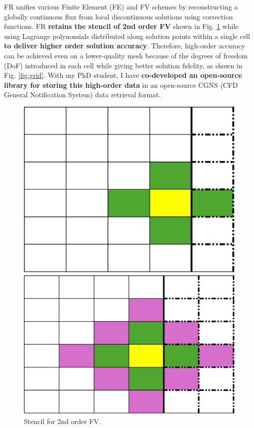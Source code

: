 \documentclass[11pt,sans]{wlscirep} %
\begin{document}
FR unifies various Finite Element (FE) and FV schemes by reconstructing a globally continuous flux from local discontinuous solutions using correction functions. FR \textbf{retains the stencil of 2nd order FV} shown in Fig. \ref{fig:stencil_2O} while using Lagrange polynomials distributed along solution points within a single cell \textbf{to deliver higher order solution accuracy}. Therefore, high-order accuracy can be achieved even on a lower-quality mesh because of the degrees of freedom (DoF) introduced in each cell while giving better solution fidelity, as shown in Fig. \ref{fig:grid}. With my PhD student, I have \textbf{co-developed an open-source library for storing this high-order data} in an open-source CGNS (CFD General Notification System) data retrieval format\cite{dhib2024input}.
\begin{figure}[H]
     \begin{minipage}{.45\textwidth}
        \centering
        \includegraphics[trim={0cm 0cm 0cm 0cm},clip,scale=0.5]{figures/2nd_order_fv_BC.png}
        \caption{Stencil for 2nd order FV.}%
        \label{fig:stencil_2O}
    \end{minipage}
    \hfill
    \begin{minipage}{0.45\textwidth}
        \centering
        \includegraphics[trim={0cm 0cm 0cm 0cm},clip,scale=0.5]{figures/3rd_order_fv_BC.png}

\end{minipage}
\end{figure}
\end{document}
